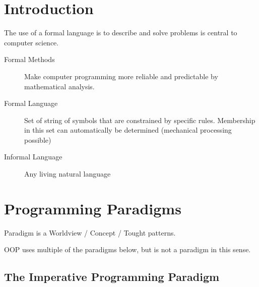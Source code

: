 


\newcommand\equalhat{\widehat{=}}
\newcommand\mathSpaceSeparator{\text{ }\text{ }\text{ }\text{ }}


\newcommand{\SUBJECT}{Zusammenfassung}
\newcommand{\TITLE}{Programmieren und Formale Methoden}




\section{Introduction}
The use of a formal language is to describe and solve problems is central to computer science.

\begin{description}
	\item[Formal Methods] Make computer programming more reliable and predictable by mathematical analysis.
	\item[Formal Language] Set of string of symbols that are constrained by specific rules. Membership in this set can automatically be determined (mechanical processing possible)
	\item[Informal Language] Any living natural language
\end{description}

\section{Programming Paradigms}

Paradigm is a Worldview / Concept / Tought patterns.

OOP uses multiple of the paradigms below, but is not a paradigm in this sense.

\subsection{The Imperative Programming Paradigm}

